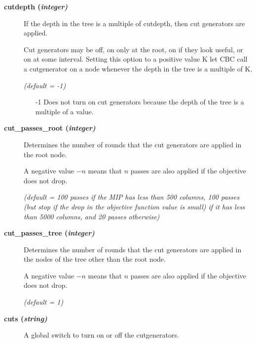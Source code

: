 \begin{description}


\item[\label{cutdepth}\hypertarget{cutdepth}
{\textbf{cutdepth (\slshape{integer})}}]\hspace{1.0in}

If the depth in the tree is a multiple of cutdepth, then cut generators are applied.

Cut generators may be off, on only at the root, on if they look useful, or on at some interval.
Setting this option to a positive value K let CBC call a cutgenerator on a node whenever the depth in the tree is a multiple of K.

\textsl{(default = -1)}
\begin{itemize}
\item[-1]
Does not turn on cut generators because the depth of the tree is a multiple of a value.
\end{itemize}

\item[\label{cut_passes_root}\hypertarget{cut_passes_root}
{\textbf{cut\_passes\_root (\slshape{integer})}}]\hspace{1.0in}

Determines the number of rounds that the cut generators are applied in the root node.

A negative value $-n$ means that $n$ passes are also applied if the objective does not drop.

\textsl{(default = 100 passes if the MIP has less than 500 columns, 100 passes (but stop if the drop in the objective function value is small) if it has less than 5000 columns, and 20 passes otherwise)}


\item[\label{cut_passes_tree}\hypertarget{cut_passes_tree}
{\textbf{cut\_passes\_tree (\slshape{integer})}}]\hspace{1.0in}

Determines the number of rounds that the cut generators are applied in the nodes of the tree other than the root node.

A negative value $-n$ means that $n$ passes are also applied if the objective does not drop.

\textsl{(default = 1)}

\item[\label{cuts}\hypertarget{cuts}
{\textbf{cuts (\slshape{string})}}]\hspace{1.0in}

A global switch to turn on or off the cutgenerators.


\end{description}

